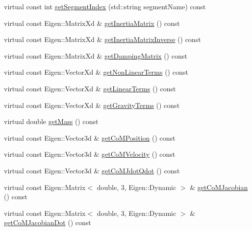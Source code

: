 \begin{DoxyCompactItemize}
\item 
virtual const int \hyperlink{classocra__icub_1_1OcraWbiModel_a9750492360a40e1b182ab05d19526ba2}{get\+Segment\+Index} (std\+::string segment\+Name) const
\item 
virtual const Eigen\+::\+Matrix\+Xd \& \hyperlink{classocra__icub_1_1OcraWbiModel_a019c1b4e52bad759d31d9ac60a268ab2}{get\+Inertia\+Matrix} () const
\item 
virtual const Eigen\+::\+Matrix\+Xd \& \hyperlink{classocra__icub_1_1OcraWbiModel_abba2c3248a9e526e98aa54935c75e84e}{get\+Inertia\+Matrix\+Inverse} () const
\item 
virtual const Eigen\+::\+Matrix\+Xd \& \hyperlink{classocra__icub_1_1OcraWbiModel_abe5946b7948e22fedfd09575fd4edbf7}{get\+Damping\+Matrix} () const
\item 
virtual const Eigen\+::\+Vector\+Xd \& \hyperlink{classocra__icub_1_1OcraWbiModel_a5802b0c6f4a8221e681fa41558f1b57c}{get\+Non\+Linear\+Terms} () const
\item 
virtual const Eigen\+::\+Vector\+Xd \& \hyperlink{classocra__icub_1_1OcraWbiModel_a08c2f48dfb8a6239efaa3d32cc92fa10}{get\+Linear\+Terms} () const
\item 
virtual const Eigen\+::\+Vector\+Xd \& \hyperlink{classocra__icub_1_1OcraWbiModel_a3457af2956db10e303a65886c62c076d}{get\+Gravity\+Terms} () const
\item 
virtual double \hyperlink{classocra__icub_1_1OcraWbiModel_a0d87a5d9c814db9ff24504890ef10395}{get\+Mass} () const
\item 
virtual const Eigen\+::\+Vector3d \& \hyperlink{classocra__icub_1_1OcraWbiModel_ac7f1d9d4677358db4c0c34ade2f645bd}{get\+Co\+M\+Position} () const
\item 
virtual const Eigen\+::\+Vector3d \& \hyperlink{classocra__icub_1_1OcraWbiModel_a08a0b1a4be74a6456162d60e38d470cd}{get\+Co\+M\+Velocity} () const
\item 
virtual const Eigen\+::\+Vector3d \& \hyperlink{classocra__icub_1_1OcraWbiModel_a38ee68461d9c5d6fccd876321fb0163a}{get\+Co\+M\+Jdot\+Qdot} () const
\item 
virtual const Eigen\+::\+Matrix$<$ double, 3, Eigen\+::\+Dynamic $>$ \& \hyperlink{classocra__icub_1_1OcraWbiModel_afc4580224117e18bcbed51a478da22f4}{get\+Co\+M\+Jacobian} () const
\item 
virtual const Eigen\+::\+Matrix$<$ double, 3, Eigen\+::\+Dynamic $>$ \& \hyperlink{classocra__icub_1_1OcraWbiModel_a216eae4ac21f869688b8eaf88e05b99b}{get\+Co\+M\+Jacobian\+Dot} () const
\item 

\end{DoxyCompactItemize}
